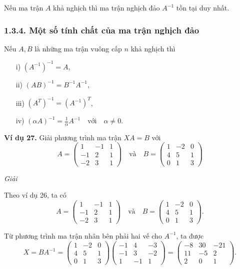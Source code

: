 Nếu ma trận \(A\) khả nghịch thì ma trận nghịch đảo \(A^{-1}\) tồn tại duy nhất.

\subsubsection*{1.3.4. Một số tính chất của ma trận nghịch đảo}

Nếu \(A, B\) là những ma trận vuông cấp \(n\) khả nghịch thì
\begin{itemize}
    \item[i)] \((A^{-1})^{-1} = A\),
    \item[ii)] \((AB)^{-1} = B^{-1}A^{-1}\),
    \item[iii)] \((A^T)^{-1} = (A^{-1})^T\),
    \item[iv)] \((\alpha A)^{-1} = \frac{1}{\alpha} A^{-1} \quad \text{với} \quad \alpha \neq 0.\)
\end{itemize}

\textbf{Ví dụ 27.} Giải phương trình ma trận \(XA = B\) với
\[
A = \begin{pmatrix}
1 & -1 & 1 \\
-1 & 2 & 1 \\
-2 & 3 & 1
\end{pmatrix}
\quad \text{và} \quad
B = \begin{pmatrix}
1 & -2 & 0 \\
4 & 5 & 1 \\
0 & 1 & 3
\end{pmatrix}
\]

\textit{Giải}

Theo ví dụ 26, ta có
\[
A = \begin{pmatrix}
1 & -1 & 1 \\
-1 & 2 & 1 \\
-2 & 3 & 1
\end{pmatrix}
\quad \text{và} \quad
B = \begin{pmatrix}
1 & -2 & 0 \\
4 & 5 & 1 \\
0 & 1 & 3
\end{pmatrix}.
\]

Từ phương trình ma trận nhân bên phải hai vế cho \(A^{-1}\), ta được
\[
X = BA^{-1} = \begin{pmatrix}
1 & -2 & 0 \\
4 & 5 & 1 \\
0 & 1 & 3
\end{pmatrix}
\begin{pmatrix}
-1 & 4 & -3 \\
-1 & 3 & -2 \\
1 & -1 & 1
\end{pmatrix} = \begin{pmatrix}
-8 & 30 & -21 \\
11 & -5 & 2 \\
2 & 0 & 1
\end{pmatrix}.
\]

